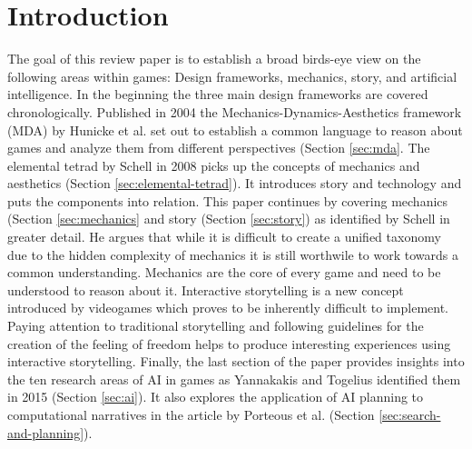 \section{Introduction}
The goal of this review paper is to establish a broad birds-eye view on the following areas within games: Design frameworks, mechanics, story, and artificial intelligence.
In the beginning the three main design frameworks are covered chronologically.
Published in 2004 the Mechanics-Dynamics-Aesthetics framework (MDA) by Hunicke et al. \cite{Hunicke2004} set out to establish a common language to reason about games and analyze them from different perspectives (Section \ref{sec:mda}.
The elemental tetrad by Schell in 2008 \cite{Schell2014} picks up the concepts of mechanics and aesthetics (Section \ref{sec:elemental-tetrad}).
It introduces story and technology and puts the components into relation.
This paper continues by covering mechanics (Section \ref{sec:mechanics} and story (Section \ref{sec:story}) as identified by Schell in greater detail.
He argues that while it is difficult to create a unified taxonomy due to the hidden complexity of mechanics it is still worthwile to work towards a common understanding.
Mechanics are the core of every game and need to be understood to reason about it.
Interactive storytelling is a new concept introduced by videogames which proves to be inherently difficult to implement.
Paying attention to traditional storytelling and following guidelines for the creation of the feeling of freedom helps to produce interesting experiences using interactive storytelling.
Finally, the last section of the paper provides insights into the ten research areas of AI in games as Yannakakis and Togelius identified them in 2015 (Section \ref{sec:ai}).
It also explores the application of AI planning to computational narratives in the article by Porteous et al.\cite{Porteous2010} (Section \ref{sec:search-and-planning}).
